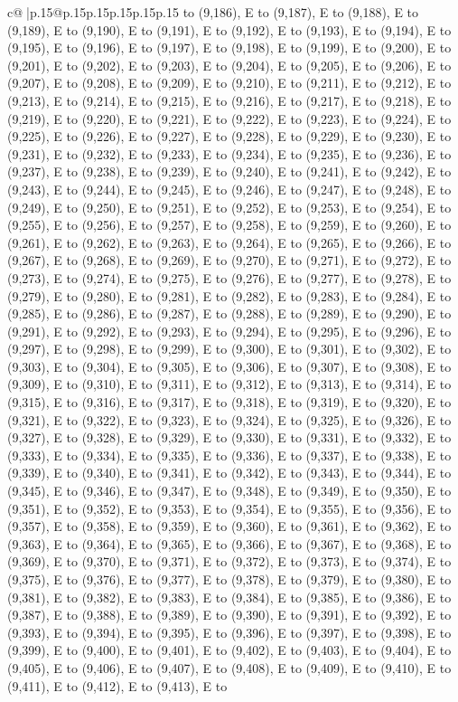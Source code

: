 \documentclass{article}
\begin{document}
{\begin{supertabular}{c@{$\;$}|p{.15\linewidth}@{}p{.15\linewidth}p{.15\linewidth}p{.15\linewidth}p{.15\linewidth}p{.15\linewidth}}
{{{to (9,186), E to (9,187), E to (9,188), E to (9,189), E to (9,190), E to (9,191), E to (9,192), E to (9,193), E to (9,194), E to (9,195), E to (9,196), E to (9,197), E to (9,198), E to (9,199), E to (9,200), E to (9,201), E to (9,202), E to (9,203), E to (9,204), E to (9,205), E to (9,206), E to (9,207), E to (9,208), E to (9,209), E to (9,210), E to (9,211), E to (9,212), E to (9,213), E to (9,214), E to (9,215), E to (9,216), E to (9,217), E to (9,218), E to (9,219), E to (9,220), E to (9,221), E to (9,222), E to (9,223), E to (9,224), E to (9,225), E to (9,226), E to (9,227), E to (9,228), E to (9,229), E to (9,230), E to (9,231), E to (9,232), E to (9,233), E to (9,234), E to (9,235), E to (9,236), E to (9,237), E to (9,238), E to (9,239), E to (9,240), E to (9,241), E to (9,242), E to (9,243), E to (9,244), E to (9,245), E to (9,246), E to (9,247), E to (9,248), E to (9,249), E to (9,250), E to (9,251), E to (9,252), E to (9,253), E to (9,254), E to (9,255), E to (9,256), E to (9,257), E to (9,258), E to (9,259), E to (9,260), E to (9,261), E to (9,262), E to (9,263), E to (9,264), E to (9,265), E to (9,266), E to (9,267), E to (9,268), E to (9,269), E to (9,270), E to (9,271), E to (9,272), E to (9,273), E to (9,274), E to (9,275), E to (9,276), E to (9,277), E to (9,278), E to (9,279), E to (9,280), E to (9,281), E to (9,282), E to (9,283), E to (9,284), E to (9,285), E to (9,286), E to (9,287), E to (9,288), E to (9,289), E to (9,290), E to (9,291), E to (9,292), E to (9,293), E to (9,294), E to (9,295), E to (9,296), E to (9,297), E to (9,298), E to (9,299), E to (9,300), E to (9,301), E to (9,302), E to (9,303), E to (9,304), E to (9,305), E to (9,306), E to (9,307), E to (9,308), E to (9,309), E to (9,310), E to (9,311), E to (9,312), E to (9,313), E to (9,314), E to (9,315), E to (9,316), E to (9,317), E to (9,318), E to (9,319), E to (9,320), E to (9,321), E to (9,322), E to (9,323), E to (9,324), E to (9,325), E to (9,326), E to (9,327), E to (9,328), E to (9,329), E to (9,330), E to (9,331), E to (9,332), E to (9,333), E to (9,334), E to (9,335), E to (9,336), E to (9,337), E to (9,338), E to (9,339), E to (9,340), E to (9,341), E to (9,342), E to (9,343), E to (9,344), E to (9,345), E to (9,346), E to (9,347), E to (9,348), E to (9,349), E to (9,350), E to (9,351), E to (9,352), E to (9,353), E to (9,354), E to (9,355), E to (9,356), E to (9,357), E to (9,358), E to (9,359), E to (9,360), E to (9,361), E to (9,362), E to (9,363), E to (9,364), E to (9,365), E to (9,366), E to (9,367), E to (9,368), E to (9,369), E to (9,370), E to (9,371), E to (9,372), E to (9,373), E to (9,374), E to (9,375), E to (9,376), E to (9,377), E to (9,378), E to (9,379), E to (9,380), E to (9,381), E to (9,382), E to (9,383), E to (9,384), E to (9,385), E to (9,386), E to (9,387), E to (9,388), E to (9,389), E to (9,390), E to (9,391), E to (9,392), E to (9,393), E to (9,394), E to (9,395), E to (9,396), E to (9,397), E to (9,398), E to (9,399), E to (9,400), E to (9,401), E to (9,402), E to (9,403), E to (9,404), E to (9,405), E to (9,406), E to (9,407), E to (9,408), E to (9,409), E to (9,410), E to (9,411), E to (9,412), E to (9,413), E to }}}
\end{supertabular}}
\end{document}
